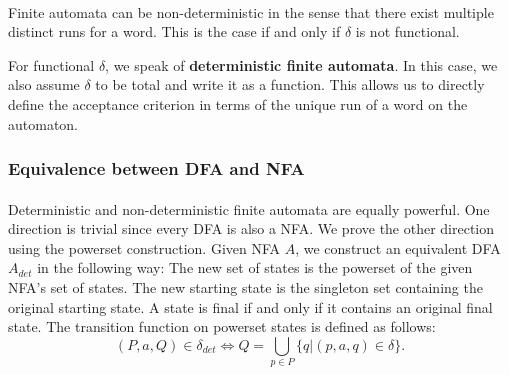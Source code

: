 \documentclass[11pt,a4paper,oneside]{book}
\begin{document}

                \paragraph{} 
                Finite automata can be non-deterministic in the sense that there exist multiple distinct runs for a word. This is the case if and only if $\delta$ is not functional. 



                For functional $\delta$, we speak of \textbf{deterministic finite automata}. In this case, we also assume $\delta$ to be total and write it as a function. 
                This allows us to directly define the acceptance criterion in terms of the unique run of a word on the automaton. 


                \subsubsection{Equivalence between DFA and NFA}
                    \paragraph{} 
                        Deterministic and non-deterministic finite automata are equally powerful. 
                        One direction is trivial since every DFA is also a NFA. 
                        We prove the other direction using the powerset construction. 
                        Given NFA $A$, we construct an equivalent DFA $A_{det}$ in the following way:
                        The new set of states is the powerset of the given NFA's set of states. 
                        The new starting state is the singleton set containing the original starting state. 
                        A state is final if and only if it contains an original final state. 
                        The transition function on powerset states is defined as follows:
                        \[
                            (P, a, Q) \in \delta_{det} \Longleftrightarrow Q = \bigcup \limits _{p \in P} \{ q | (p,a,q) \in \delta \}.
                        \]
\end{document}
